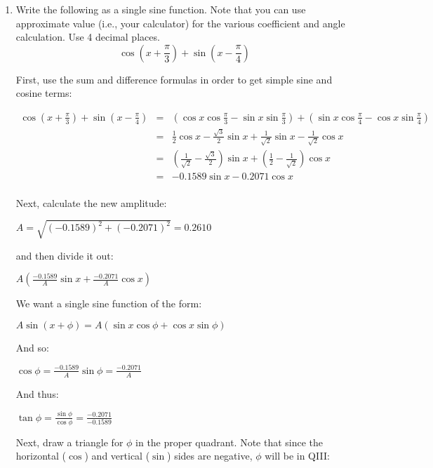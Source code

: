\documentclass[letterpaper,12pt,fleqn]{article}
\newcommand{\p}{\phi}
\begin{document}
\begin{enumerate}
\item Write the following as a single sine function. Note that you can use
  approximate value (i.e., your calculator) for the various coefficient and
  angle calculation. Use 4 decimal places.
  \[\cos\left(x+\frac{\pi}{3}\right)+\sin\left(x-\frac{\pi}{4}\right)\]

  First, use the sum and difference formulas in order to get simple sine and
  cosine terms:

  \begin{eqnarray*}
    \cos\left(x+\frac{\pi}{3}\right)+\sin\left(x-\frac{\pi}{4}\right) &=&
    \left(\cos{x}\cos{\frac{\pi}{3}}-\sin{x}\sin{\frac{\pi}{3}}\right)+
    \left(\sin{x}\cos{\frac{\pi}{4}}-\cos{x}\sin{\frac{\pi}{4}}\right) \\
    &=& \frac{1}{2}\cos{x}-\frac{\sqrt{3}}{2}\sin{x}+
    \frac{1}{\sqrt{2}}\sin{x}-\frac{1}{\sqrt{2}}\cos{x} \\
    &=& \left(\frac{1}{\sqrt{2}}-\frac{\sqrt{3}}{2}\right)\sin{x}+
    \left(\frac{1}{2}-\frac{1}{\sqrt{2}}\right)\cos{x} \\
    &=& -0.1589\sin{x}-0.2071\cos{x} \\
  \end{eqnarray*}

  Next, calculate the new amplitude:

  $A=\sqrt{(-0.1589)^2+(-0.2071)^2}=0.2610$

  and then divide it out:

  $A\left(\frac{-0.1589}{A}\sin{x}+\frac{-0.2071}{A}\cos{x}\right)$

  We want a single sine function of the form:

  $A\sin(x+\p)=A(\sin x\cos\p+\cos x\sin\p)$

  And so:

  $\cos\p=\frac{-0.1589}{A}$\qquad$\sin\p=\frac{-0.2071}{A}$

  And thus:

  $\tan\p=\frac{\sin\p}{\cos\p}=\frac{-0.2071}{-0.1589}$

  Next, draw a triangle for $\p$ in the proper quadrant. Note that since the
  horizontal ($\cos$) and vertical ($\sin$) sides are negative, $\p$ will be
  in QIII:

  \begin{center}
  \end{center}


\end{enumerate}
\end{document}
